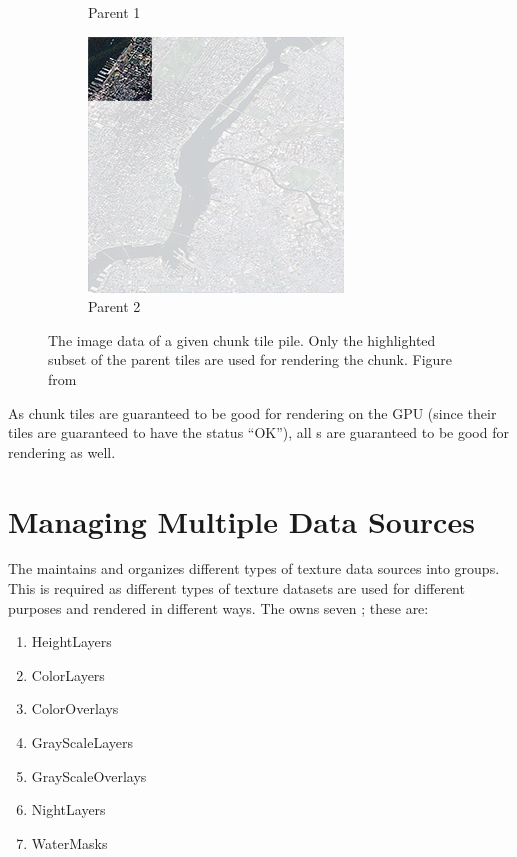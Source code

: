 \begin{figure}[htbp]
\begin{subfigure}[t]{0.3\textwidth}
        \caption{Parent 1}
    \end{subfigure}
    \quad
    \begin{subfigure}[t]{0.3\textwidth}
        \includegraphics[width=\textwidth]{figures/implementation/chunktile/chunktilepile1.png}
        \caption{Parent 2}
    \end{subfigure}
    \caption{The image data of a given chunk tile pile. Only the highlighted subset of the parent tiles are used for rendering the chunk. Figure from \cite{imageryworld2d}}
    \label{fig:chunktilepile}
\end{figure}

As chunk tiles are guaranteed to be good for rendering on the GPU (since their tiles are guaranteed to have the status ``OK''), all s are guaranteed to be good for rendering as well. 

\section{Managing Multiple Data Sources}
The  maintains and organizes different types of texture data sources into groups. This is required as different types of texture datasets are used for different purposes and rendered in different ways. The  owns seven ; these are:
\pagebreak
\begin{enumerate}
\item HeightLayers
\item ColorLayers
\item ColorOverlays
\item GrayScaleLayers
\item GrayScaleOverlays
\item NightLayers
\item WaterMasks
\end{enumerate}

